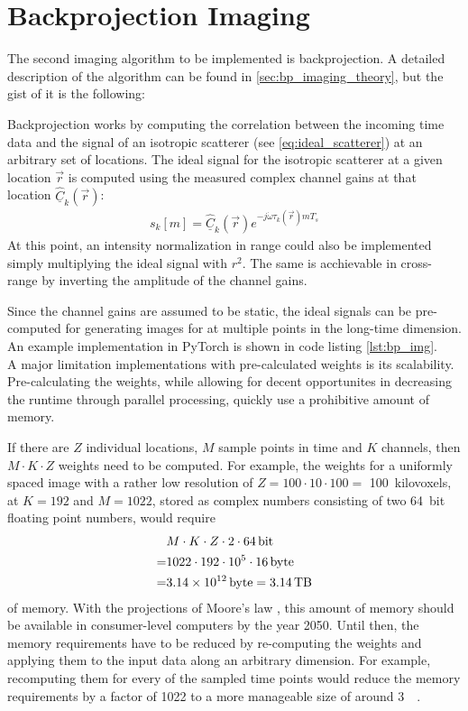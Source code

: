 \section{Backprojection Imaging}

The second imaging algorithm to be implemented is backprojection.
A detailed description of the algorithm can be found in \autoref{sec:bp_imaging_theory},
but the gist of it is the following:

Backprojection works by computing the correlation between the incoming time data
and the signal of an isotropic scatterer (see \autoref{eq:ideal_scatterer})
at an arbitrary set of locations. 
The ideal signal for the isotropic scatterer at a given location $\vec r$
is computed using the measured complex channel gains at that location $\underline{\hat C}_k(\vec r)$:
\begin{align*}
    s_k[m] = \underline{\hat C}_k(\vec r) e^{-j\dot\omega\tau_k(\vec r)mT_s}
\end{align*}
At this point, an intensity normalization in range 
could also be implemented simply multiplying the ideal signal with $r^2$. 
The same is acchievable in cross-range by inverting the amplitude of the channel gains.

Since the channel gains are assumed to be static,
the ideal signals can be pre-computed for generating images for at multiple points in the long-time dimension.
An example implementation in PyTorch is shown in code listing \ref{lst:bp_img}.
\\

A major limitation implementations with pre-calculated weights is its scalability.
Pre-calculating the weights, while allowing for decent opportunites in decreasing the runtime through parallel processing,
quickly use a prohibitive amount of memory.

If there are $Z$ individual locations, $M$ sample points in time and $K$ channels, then $M \cdot K \cdot Z$ weights need to be computed.
For example, the weights for a uniformly spaced image with a rather low resolution of  $Z = 100 \cdot 10 \cdot 100 =$ \SI{100}{kilovoxels},
at $K=192$ and $M=1022$, stored as complex numbers consisting of two \SI{64}{bit} floating point numbers, would require
\begin{align*}
      & M \cdot K \cdot Z \cdot 2 \cdot \SI{64}{\bit} \\
    = & 1022 \cdot 192 \cdot 10^5 \cdot \SI{16}{byte} \\
    = & \SI{3.14e12}{byte} = \SI{3.14}{\tera\byte}
\end{align*}
of memory.
With the projections of Moore's law \cite{mooreslaw},
this amount of memory should be available in consumer-level computers by the year 2050.
Until then, the memory requirements have to be reduced by re-computing the weights
and applying them to the input data along an arbitrary dimension.
For example, recomputing them for every of the sampled time points would reduce
the memory requirements by a factor of 1022 to a more manageable size of around \SI{3}{\giga\byte}.

